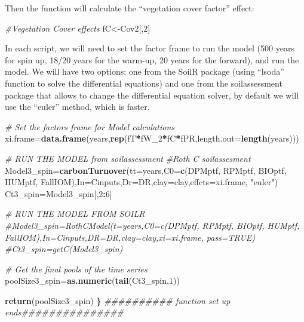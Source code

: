 \documentclass[
  10pt,
  b5paper,
]{book}
\newenvironment{Shaded}{\begin{snugshade}}{\end{snugshade}}
\newcommand{\CommentTok}[1]{\textcolor[rgb]{0.56,0.35,0.01}{\textit{#1}}}
\newcommand{\DataTypeTok}[1]{\textcolor[rgb]{0.13,0.29,0.53}{#1}}
\newcommand{\DecValTok}[1]{\textcolor[rgb]{0.00,0.00,0.81}{#1}}
\newcommand{\ErrorTok}[1]{\textcolor[rgb]{0.64,0.00,0.00}{\textbf{#1}}}
\newcommand{\KeywordTok}[1]{\textcolor[rgb]{0.13,0.29,0.53}{\textbf{#1}}}
\newcommand{\NormalTok}[1]{#1}
\newcommand{\OperatorTok}[1]{\textcolor[rgb]{0.81,0.36,0.00}{\textbf{#1}}}
\newcommand{\StringTok}[1]{\textcolor[rgb]{0.31,0.60,0.02}{#1}}
\begin{document}
\begin{Shaded}
\end{Shaded}

Then the function will calculate the ``vegetation cover factor'' effect:

\begin{Shaded}
\begin{Highlighting}[]
\CommentTok{#Vegetation Cover effects }
\NormalTok{fC<-Cov2[,}\DecValTok{2}\NormalTok{]}
\end{Highlighting}
\end{Shaded}

In each script, we will need to set the factor frame to run the model (500 years for spin up, 18/20 years for the warm-up, 20 years for the forward), and run the model. We will have two options: one from the SoilR package (using ``lsoda'' function to solve the differential equations) and one from the soilassessment package that allows to change the differential equation solver, by default we will use the ``euler'' method, which is faster.

\begin{Shaded}
\begin{Highlighting}[]
\CommentTok{# Set the factors frame for Model calculations}
\NormalTok{xi.frame=}\KeywordTok{data.frame}\NormalTok{(years,}\KeywordTok{rep}\NormalTok{(fT}\OperatorTok{*}\NormalTok{fW_}\DecValTok{2}\OperatorTok{*}\NormalTok{fC}\OperatorTok{*}\NormalTok{fPR,}\DataTypeTok{length.out=}\KeywordTok{length}\NormalTok{(years)))}


\CommentTok{# RUN THE MODEL from soilassessment}
\CommentTok{#Roth C soilassesment}
\NormalTok{Model3_spin=}\KeywordTok{carbonTurnover}\NormalTok{(}\DataTypeTok{tt=}\NormalTok{years,}\DataTypeTok{C0=}\KeywordTok{c}\NormalTok{(DPMptf, RPMptf, BIOptf, HUMptf, FallIOM),}\DataTypeTok{In=}\NormalTok{Cinputs,}\DataTypeTok{Dr=}\NormalTok{DR,}\DataTypeTok{clay=}\NormalTok{clay,}\DataTypeTok{effcts=}\NormalTok{xi.frame, }\StringTok{"euler"}\NormalTok{) }
\NormalTok{Ct3_spin=Model3_spin[,}\DecValTok{2}\OperatorTok{:}\DecValTok{6}\NormalTok{]}

\CommentTok{# RUN THE MODEL FROM SOILR}
\CommentTok{#Model3_spin=RothCModel(t=years,C0=c(DPMptf, RPMptf, BIOptf, HUMptf, FallIOM),In=Cinputs,DR=DR,clay=clay,xi=xi.frame, pass=TRUE) }
\CommentTok{#Ct3_spin=getC(Model3_spin)}

\CommentTok{# Get the final pools of the time series}
\NormalTok{poolSize3_spin=}\KeywordTok{as.numeric}\NormalTok{(}\KeywordTok{tail}\NormalTok{(Ct3_spin,}\DecValTok{1}\NormalTok{))}

\KeywordTok{return}\NormalTok{(poolSize3_spin)}
\ErrorTok{\}}
\CommentTok{########## function set up ends###############}
\end{Highlighting}
\end{Shaded}
\end{document}

